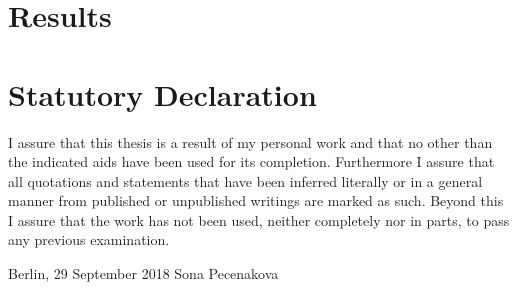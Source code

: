 \documentclass[12pt]{report}
\begin{document}
\chapter{Results}





\appendix
\newpage
\listoffigures

\newpage
\listoftables

\newpage

\renewcommand{\refname}{Bibliography}

\clearpage


\pagestyle{plain}
\chapter*{Statutory Declaration}
I assure that this thesis is a result of my personal work and that no other than the indicated aids have been used for its completion. Furthermore I assure that all quotations and statements that have been inferred literally or in a general manner from published or unpublished writings are marked as such. Beyond this I assure that the work has not been used, neither completely nor in parts, to pass any previous examination.

\vspace{2cm}
\noindent
Berlin, 29 September 2018
\hfill
Sona Pecenakova
\clearpage
\end{document}
